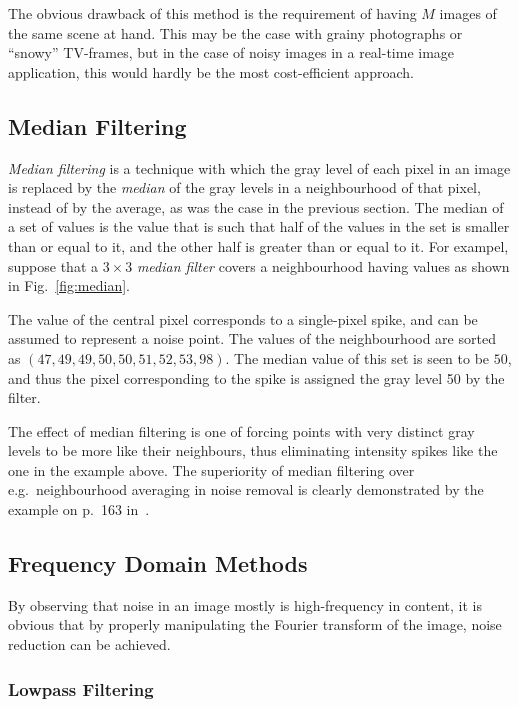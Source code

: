 The obvious drawback of this method is the requirement of having $M$
images of the same scene at hand.  This may be the case with grainy
photographs or ``snowy'' TV-frames, but in the case of noisy images in
a real-time image application, this would hardly be the most
cost-efficient approach.

\subsection{Median Filtering}
\label{image:noise:median}

{\em Median filtering\/} is a technique with which the gray level of
each pixel in an image is replaced by the {\em median\/} of the gray
levels in a neighbourhood of that pixel, instead of by the average, as
was the case in the previous section.  The median of a set of values
is the value that is such that half of the values in the set is
smaller than or equal to it, and the other half is greater than or
equal to it.  For exampel, suppose that a $3\times 3$ {\em median
  filter\/} covers a neighbourhood having values as shown in
Fig.~\ref{fig:median}.


The value of the central pixel corresponds to a single-pixel spike,
and can be assumed to represent a noise point.  The values of the
neighbourhood are sorted as $(47,49,49,50,50,51,52,53,98)$.  The
median value of this set is seen to be $50$, and thus the pixel
corresponding to the spike is assigned the gray level 50 by the
filter.

The effect of median filtering is one of forcing points with very
distinct gray levels to be more like their neighbours, thus
eliminating intensity spikes like the one in the example above.  The
superiority of median filtering over e.g.\ neighbourhood averaging in
noise removal is clearly demonstrated by the example on p.\ 163
in~\cite{digim}.

\subsection{Frequency Domain Methods}
\label{image:noise:frequency}

By observing that noise in an image mostly is high-frequency in
content, it is obvious that by properly manipulating the Fourier
transform of the image, noise reduction can be achieved.

\subsubsection{Lowpass Filtering}

